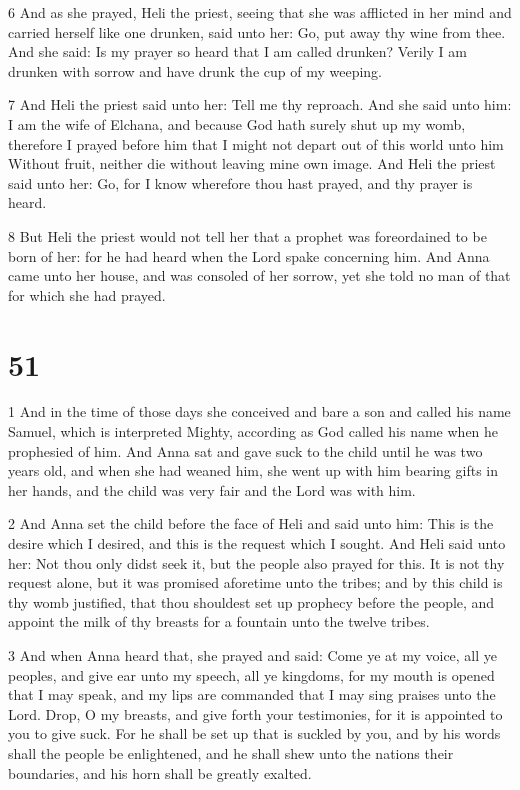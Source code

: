 \par 6 And as she prayed, Heli the priest, seeing that she was afflicted in her mind and carried herself like one drunken, said unto her: Go, put away thy wine from thee. And she said: Is my prayer so heard that I am called drunken? Verily I am drunken with sorrow and have drunk the cup of my weeping. 

\par 7 And Heli the priest said unto her: Tell me thy reproach. And she said unto him: I am the wife of Elchana, and because God hath surely shut up my womb, therefore I prayed before him that I might not depart out of this world unto him Without fruit, neither die without leaving mine own image. And Heli the priest said unto her: Go, for I know wherefore thou hast prayed, and thy prayer is heard. 

\par 8 But Heli the priest would not tell her that a prophet was foreordained to be born of her: for he had heard when the Lord spake concerning him. And Anna came unto her house, and was consoled of her sorrow, yet she told no man of that for which she had prayed.

\chapter{51}

\par 1 And in the time of those days she conceived and bare a son and called his name Samuel, which is interpreted Mighty, according as God called his name when he prophesied of him. And Anna sat and gave suck to the child until he was two years old, and when she had weaned him, she went up with him bearing gifts in her hands, and the child was very fair and the Lord was with him. 

\par 2 And Anna set the child before the face of Heli and said unto him: This is the desire which I desired, and this is the request which I sought. And Heli said unto her: Not thou only didst seek it, but the people also prayed for this. It is not thy request alone, but it was promised aforetime unto the tribes; and by this child is thy womb justified, that thou shouldest set up prophecy before the people, and appoint the milk of thy breasts for a fountain unto the twelve tribes.

\par 3 And when Anna heard that, she prayed and said: Come ye at my voice, all ye peoples, and give ear unto my speech, all ye kingdoms, for my mouth is opened that I may speak, and my lips are commanded that I may sing praises unto the Lord. Drop, O my breasts, and give forth your testimonies, for it is appointed to you to give suck. For he shall be set up that is suckled by you, and by his words shall the people be enlightened, and he shall shew unto the nations their boundaries, and his horn shall be greatly exalted. 

